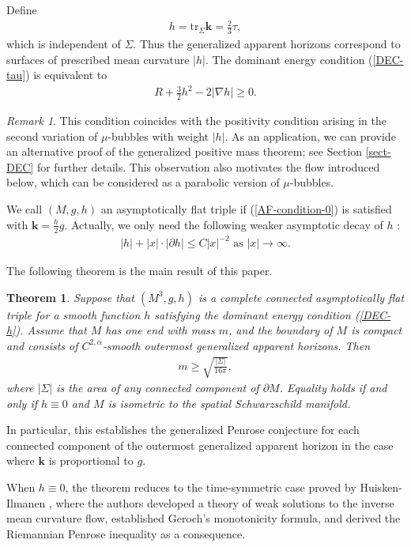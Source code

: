 \documentclass[11pt, letterpaper]{amsart}
\newtheorem{thm}{Theorem}[section]
\theoremstyle{definition}
\theoremstyle{remark}
\newtheorem{rmk}{Remark}[section]
\begin{document}
Define
\begin{align*}
	h= \mathrm{tr}_{\Sigma } \mathbf{k} = \frac{2}{3}\tau,
\end{align*}
which is independent of $\Sigma $.
Thus the generalized apparent horizons correspond to surfaces of prescribed mean curvature $|h|$. 
The dominant energy condition (\ref{DEC-tau}) is equivalent to
\begin{align}\label{DEC-h}
	R + \frac{3}{2} h^2 - 2 |\nabla h | \geq 0.
\end{align} 
\begin{rmk}
	This condition coincides with the positivity condition arising in the second variation of $\mu $-bubbles with weight $|h|$. As an application, we can provide an alternative proof of the generalized positive mass theorem; see Section \ref{sect-DEC} for further details. This observation also motivates the flow introduced below, which can be considered as a parabolic version of $\mu $-bubbles.
\end{rmk}

We call $(M, g, h)$ an asymptotically flat triple if (\ref{AF-condition-0}) is satisfied with $\mathbf{k} = \frac{h}{2} g$. Actually, we only need the following weaker asymptotic decay of $h$ : 
\begin{align}
	|h| + |x|\cdot |\partial  h| \leq C|x|^{-2} \text{ as }|x| \to \infty.
\end{align}


The following theorem is the main result of this paper.
\begin{thm}\label{thm-main}
	Suppose that $(M^3, g, h)$ is a complete connected asymptotically flat triple for a smooth function $h$ satisfying the dominant energy condition (\ref{DEC-h}). Assume that $M$ has one end with mass $m$, and the boundary of $M$ is compact and consists of $C^{2,\alpha }$-smooth outermost generalized apparent horizons. Then 
	\begin{align}
		m \geq \sqrt{\frac{|\Sigma |}{16 \pi }} ,
	\end{align}
	where $|\Sigma |$ is the area of any connected component of $\partial M$. Equality holds if and only if $h \equiv 0$ and $M$ is isometric to the spatial Schwarzschild manifold.
\end{thm}


In particular, this establishes the generalized Penrose conjecture for each connected component of the outermost generalized apparent horizon in the case where $\mathbf{k}$ is proportional to $g$. 


When $h \equiv 0$, the theorem reduces to the time-symmetric case proved by Huisken-Ilmanen \cite{HI01}, where the authors developed a theory of weak solutions to the inverse mean curvature flow, established Geroch's monotonicity formula, and derived the Riemannian Penrose inequality as a consequence.
\end{document}
